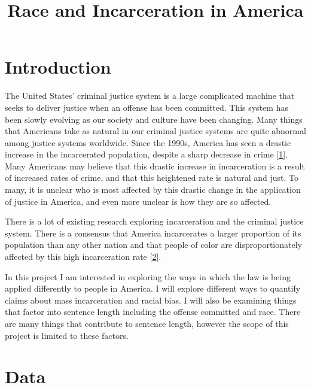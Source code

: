 \documentclass[11pt]{article}
\title{Race and Incarceration in America}
\begin{document}
    
    
    \maketitle
    
    

    
    \hypertarget{introduction}{%
\section{Introduction}\label{introduction}}

The United States' criminal justice system is a large complicated
machine that seeks to deliver justice when an offense has been
committed. This system has been slowly evolving as our society and
culture have been changing. Many things that Americans take as natural
in our criminal justice systems are quite abnormal among justice systems
worldwide. Since the 1990s, America has seen a drastic increase in the
incarcerated population, despite a sharp decrease in crime
{[}\href{https://www.nytimes.com/2008/04/23/world/americas/23iht-23prison.12253738.html}{1}{]}.
Many Americans may believe that this drastic increase in incarceration
is a result of increased rates of crime, and that this heightened rate
is natural and just. To many, it is unclear who is most affected by this
drastic change in the application of justice in America, and even more
unclear is how they are so affected.

There is a lot of existing research exploring incarceration and the
criminal justice system. There is a consensus that America incarcerates
a larger proportion of its population than any other nation and that
people of color are disproportionately affected by this high
incarceration rate
{[}\href{https://www.nytimes.com/2008/04/23/world/americas/23iht-23prison.12253738.html}{2}{]}.

In this project I am interested in exploring the ways in which the law
is being applied differently to people in America. I will explore
different ways to quantify claims about mass incarceration and racial
bias. I will also be examining things that factor into sentence length
including the offense committed and race. There are many things that
contribute to sentence length, however the scope of this project is
limited to these factors.

    \hypertarget{data}{%
\section{Data}\label{data}}
\end{document}
